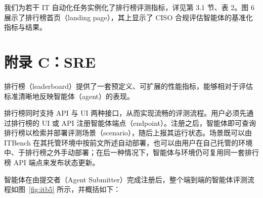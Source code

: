\documentclass[10pt,UTF8,fontset=fandol]{ctexart}
\begin{document}
我们为若干 IT 自动化任务实例化了排行榜评测指标，详见第 3.1 节、表 2。图 6 展示了排行榜首页（landing page），其上显示了 CISO 合规评估智能体的基准化指标与结果。
\section{附录 C：SRE}

排行榜（leaderboard）提供了一套预定义、可扩展的性能指标，能够相对于评估标准清晰地反映智能体（agent）的表现。

排行榜同时支持 API 与 UI 两种接口，从而实现流畅的评测流程。用户必须先通过排行榜的 UI 或 API 注册智能体端点（endpoint）。注册之后，智能体即可查询排行榜以检索并部署评测场景（scenario），随后上报其运行状态。场景既可以由 ITBench 在其托管环境中按前文所述自动部署，也可以由用户在自己托管的环境中、于排行榜之外手动部署；在后一种情况下，智能体与环境仍可复用同一套排行榜 API 端点来发布状态更新。

智能体在由提交者（Agent Submitter）完成注册后，整个端到端的智能体评测流程如图~\ref{fig:itb5} 所示，并概括如下：
\end{document}
